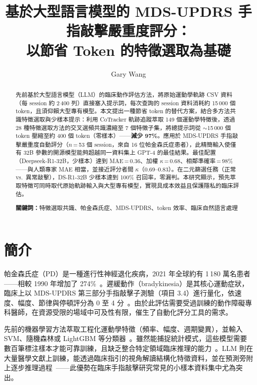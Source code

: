 \documentclass[12pt, a4paper]{article}
\title{\textbf{基於大型語言模型的 MDS-UPDRS 手指敲擊嚴重度評分：\\以節省 Token 的特徵選取為基礎}}
\author[1]{Gary Wang}
\affil[1]{Nordling Lab，國立成功大學機械工程學系，台南 70101，台灣\\
\texttt{gary.wang@nordlinglab.org}}
\date{}
\begin{document}
\maketitle

\begin{abstract}
先前基於大型語言模型（LLM）的臨床動作評估方法，將原始運動學軌跡 CSV 資料（每 session 約 2\,400 列）直接塞入提示詞，每次查詢的 session 資料消耗約 15\,000 個 token，且須仰賴大型專有模型。本文提出一種節省 token 的替代方案，結合多方法共識特徵選取與少樣本提示：利用 CoTracker 軌跡追蹤萃取 149 個運動學特徵後，透過 28 種特徵選取方法的交叉選頻共識濃縮至 7 個特徵子集，將總提示詞從 $\sim$15\,000 個 token 壓縮至約 400 個 token（零樣本）——\textbf{減少 97\%}。應用於 MDS-UPDRS 手指敲擊嚴重度自動評分（$n$\,=\,53 個 session，來自 16 位帕金森氏症患者），此精簡輸入使僅有 32B 參數的開源模型能夠超越同一資料集上 GPT-4 的最佳結果。最佳配置（Deepseek-R1-32B，少樣本）達到 MAE\,=\,0.36、加權 $\kappa$\,=\,0.68、相鄰準確率\,=\,98\%——與人類專家 MAE 相當，並接近評分者間 $\kappa$（0.69--0.83）。在二元篩選任務（正常 vs.\ 異常敲擊），DS-R1-32B 少樣本達到 100\% 召回率，零漏判。本研究顯示，預先萃取特徵可同時取代原始軌跡輸入與大型專有模型，實現具成本效益且保護隱私的臨床評估。

\noindent\textbf{關鍵詞：}特徵選取共識、帕金森氏症、MDS-UPDRS、token 效率、臨床自然語言處理
\end{abstract}

\section{簡介}

帕金森氏症（PD）是一種進行性神經退化疾病，2021 年全球約有 1\,180 萬名患者——相較 1990 年增加了 274\%~\cite{steinmetz2024global}。遲緩動作（bradykinesia）是其核心運動症狀，臨床上以 MDS-UPDRS 第三部分手指敲擊子測驗（項目 3.4）進行量化，依速度、幅度、節律與停頓評分為 0 至 4 分~\cite{cite_updrs}。由於此評估需要受過訓練的動作障礙專科醫師，在資源受限的場域中可及性有限，催生了自動化評分工具的需求。

先前的機器學習方法萃取工程化運動學特徵（頻率、幅度、週期變異），並輸入 SVM、隨機森林或 LightGBM 等分類器~\cite{cite_ml_motor,cite_ml_motor2,yang2024deep}。雖然能捕捉統計模式，這些模型需要數百筆標注樣本才能可靠訓練，且缺乏整合特定領域臨床推理的能力~\cite{sarker2022ai}。LLM 則在大量醫學文獻上訓練，能透過臨床指引的視角解讀結構化特徵資料，並在預測旁附上逐步推理過程~\cite{minaee2024large}——此優勢在臨床手指敲擊研究常見的小樣本資料集中尤為突出。
\end{document}

